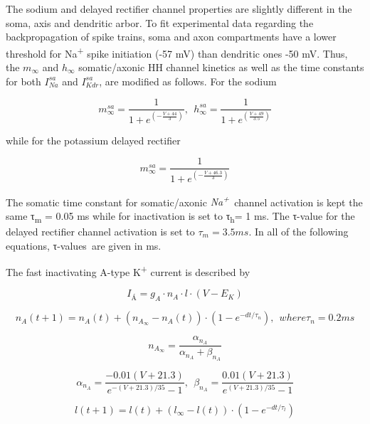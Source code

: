 \documentclass[a4paper]{article}
\begin{document}
The sodium and delayed rectifier channel properties are slightly different in the soma, axis and dendritic arbor. To fit
experimental data regarding the backpropagation of spike trains, soma and axon compartments have a lower threshold for
Na\textsuperscript{+} spike initiation (-57 mV) than dendritic ones -50 mV. Thus, the $m_{\infty}$ and $h_{\infty}$
somatic/axonic HH channel kinetics as well as the time constants for both 
$I_{Na}^{sa}$
and 
$I_{Kdr}^{sa}$,
are modified as follows. For the sodium


\begin{equation}
m_{\infty}^{sa}=\frac {1}{1+e^{(-\frac{V+44}{3})}} ,\ \ 
h_{\infty}^{sa}=\frac {1}{1+e^{(\frac{V+49}{3.5})}}
\end{equation}

while for the potassium delayed rectifier

\begin{equation}
m_{\infty}^{sa}=\frac {1}{1+e^{(-\frac{V+46.3}{3})}}
\end{equation}

The somatic time constant for somatic/axonic \textit{Na}\textit{\textsuperscript{+}}~channel activation is kept the
same τ\textsubscript{m} = 0.05 ms while for inactivation is set to τ\textsubscript{h}= 1 ms. The τ-value for the delayed rectifier channel activation is set to $τ_{m}= 3.5 ms$. In all of the
following equations, τ-values~are given in ms.



The fast inactivating A-type K\textsuperscript{+ }current is described by


\begin{equation}
I_Á = g_A\cdot n_A\cdot l\cdot (V-E_K)
\end{equation}

\begin{equation}
n_A(t+1)=n_A(t)+(n_{A_{\infty }}-n_A(t))\cdot (1-e^{-dt/τ_n}),\ \ where 
τ_n=0.2 ms
\end{equation}

\begin{equation}
n_{A_{\infty }}=\frac{α_{n_A}}{α_{n_A}+β_{n_A}}
\end{equation}

\begin{equation}
α_{n_A}=\frac{-0.01(V+21.3)}{e^{-(V+21.3)/35}-1} ,\ \  β_{n_A}=\frac{0.01(V+21.3)}{e^{(V+21.3)/35}-1}
\end{equation}

\begin{equation}
l(t+1)=l(t)+(l_{\infty }-l(t))\cdot (1-e^{-dt/τ_l})
\end{equation}
\end{document}
